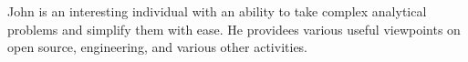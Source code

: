 

\begin{cvparagraph}

John is an interesting individual with an ability to take complex analytical problems and simplify them with ease. He providees various useful viewpoints on open source, engineering, and various other activities.

\end{cvparagraph}
